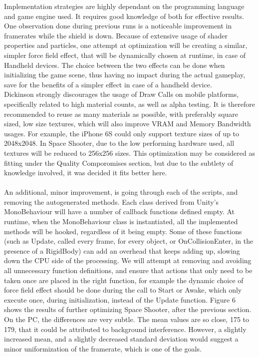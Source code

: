 Implementation strategies are highly dependant on the programming language and game engine used. It requires good knowledge of both for effective results. One observation done during previous runs is a noticeable improvement in framerates while the shield is down. Because of extensive usage of shader properties and particles, one attempt at optimization will be creating a similar, simpler force field effect, that will be dynamically chosen at runtime, in case of Handheld devices. The choice between the two effects can be done when initializing the game scene, thus having no impact during the actual gameplay, save for the benefits of a simpler effect in case of a handheld device.  \\
Dickinson strongly discourages the usage of Draw Calls on mobile platforms, specifically related to high material counts, as well as alpha testing. It is therefore recommended to reuse as many materials as possible, with preferably square sized, low size textures, which will also improve VRAM and Memory Bandwidth usages. For example, the iPhone 6S could only support texture sizes of up to 2048x2048. \cite{optimizationbook} In Space Shooter, due to the low performing hardware used, all textures will be reduced to 256x256 sizes. This optimization may be considered as fitting under the Quality Comporomises section, but due to the subtlety of knowledge involved, it was decided it fits better here. \\ \\
An additional, minor improvement, is going through each of the scripts, and removing the autogenerated methods. Each class derived from Unity's MonoBehaviour will have a number of callback functions defined empty. At runtime, when the MonoBehaviour class is instantiated, all the implemented methods will be hooked, regardless of it being empty. Some of these functions (such as Update, called every frame, for every object, or OnCollisionEnter, in the presence of a RigidBody) can add an overhead that keeps adding up, slowing down the CPU side of the processing. \cite{optimizationbook} We will attempt at removing and avoiding all unnecessary function definitions, and ensure that actions that only need to be taken once are placed in the right function, for example the dynamic choice of force field effect should be done during the call to Start or Awake, which only execute once, during initialization, instead of the Update function.
Figure 6 shows the results of further optimizing Space Shooter, after the previous section. On the PC, the differences are very subtle. The mean values are so close, 175 to 179, that it could be attributed to background interference. However, a slightly increased mean, and a slightly decreased standard deviation would suggest a minor uniformization of the framerate, which is one of the goals. \\
